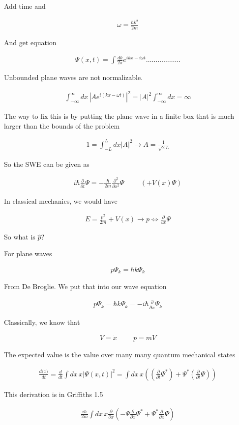 \documentclass[fleqn]{report}
\newcommand{\hp}{\hspace{1cm}}
\newcommand{\del}{\partial}
\newcommand{\equations} [1] {
\begin{gather*}
#1
\end{gather*}
}
\begin{document}
Add time and 
\equations{
\omega = \frac{\hbar k^2}{2m}
}

And get equation

\equations{
    \Psi(x, t)
    =
    \int 
    \frac{dk}{2 \pi}
    e^{ikx - i \omega t}
    \ldots
    \ldots
    \ldots
    \ldots
    \ldots
    \ldots
}

Unbounded plane waves are not normalizable. 

\equations{
    \int^\infty_{-\infty}
    dx \, 
    |A e^{i(kx - \omega t)}
    |^2
    =
    |A|^2
    \int^\infty_{-\infty}
    dx 
    =
    \infty
}

The way to fix this is by putting the plane wave in a finite box 
that is much larger than the bounds of the problem 

\equations{
    1
    =
    \int^L_{-L}
    dx 
    |A|^2
    \rightarrow
    A 
    =
    \frac{1}{\sqrt{2} L}
}

So the SWE can be given as 

\equations{
    i \hbar \frac{\del}{\del t}
    \Psi 
    =
    - \frac{\hbar}{2 m}
    \frac{\del^2}{\del x^2}
    \Psi 
    \hp
    (+ V(x) \Psi)
}

In classical mechanics, we would have 
\equations{
    E 
    =
    \frac{p^2}{2m}
    +
    V(x)
    \rightarrow 
    p 
    \iff 
    \frac{\del}{\del x}
    \Psi
}

So what is $\hat p$? 

For plane waves 
\equations{
    p \Psi_k 
    =
    \hbar k \Psi_k
}
From De Broglie. We put that into our wave equation

\equations{
    p \Psi_k 
    =
    \hbar k \Psi_k 
    =
    -i \hbar 
    \frac{\del}{\del x}
    \Psi_k
}

Classically, we know that 
\equations{
    V = \dot x 
    \hp 
    p = mV 
}

The expected value is the value over many many quantum mechanical states 
\equations{
    \frac{d \langle x \rangle}{dt}
    =
    \frac{d}{dt}
    \int dx \, 
    x |\Psi(x, t)|^2
    =
    \int dx \, 
    x 
    \left(
        \left(
            \frac{\del}{\del t} \Psi^*
        \right)
        +
        \Psi^*
        \left(
            \frac{\del}{\del t} \Psi
        \right)
    \right)
}

This derivation is in Griffiths 1.5 

\equations{
    \frac{i \hbar }{2m}
    \int dx \,
    x \frac{\del}{\del x}
    \left(
        - \Psi 
        \frac{\del}{\del x}
        \Psi^*
        +
        \Psi^*
        \frac{\del}{\del x}
        \Psi
    \right)
}
\end{document}
